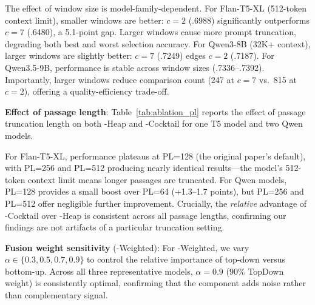 The effect of window size is model-family-dependent. For Flan-T5-XL (512-token context limit), smaller windows are better: $c=2$ (.6988) significantly outperforms $c=7$ (.6480), a 5.1-point gap. Larger windows cause more prompt truncation, degrading both best and worst selection accuracy. For Qwen3-8B (32K+ context), larger windows are slightly better: $c=7$ (.7249) edges $c=2$ (.7187). For Qwen3.5-9B, performance is stable across window sizes (.7336--.7392). Importantly, larger windows reduce comparison count (247 at $c=7$ vs.\ 815 at $c=2$), offering a quality-efficiency trade-off.

\textbf{Effect of passage length}: Table~\ref{tab:ablation_pl} reports the effect of passage truncation length on both \topdown{}-Heap and \dualend{}-Cocktail for one T5 model and two Qwen models.

\begin{table}[!htbp]
\caption{Effect of passage truncation length on NDCG@10 (DL 2019). T5-XL has a 512-token context limit; Qwen3-8B and Qwen3.5-9B have 32K+.}
\label{tab:ablation_pl}
\small
{}
\end{table}

For Flan-T5-XL, performance plateaus at PL=128 (the original paper's default), with PL=256 and PL=512 producing nearly identical results---the model's 512-token context limit means longer passages are truncated. For Qwen models, PL=128 provides a small boost over PL=64 (+1.3--1.7 points), but PL=256 and PL=512 offer negligible further improvement. Crucially, the \emph{relative} advantage of \dualend{}-Cocktail over \topdown{}-Heap is consistent across all passage lengths, confirming our findings are not artifacts of a particular truncation setting.

\textbf{Fusion weight sensitivity} (\bidir{}-Weighted): For \bidir{}-Weighted, we vary $\alpha \in \{0.3, 0.5, 0.7, 0.9\}$ to control the relative importance of top-down versus bottom-up. Across all three representative models, $\alpha=0.9$ (90\% TopDown weight) is consistently optimal, confirming that the \bottomup{} component adds noise rather than complementary signal.

